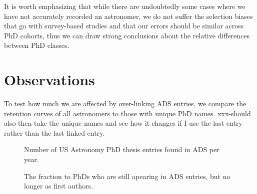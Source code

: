 \documentclass{emulateapj}
\begin{document}
It is worth emphasizing that while there are undoubtedly some cases where we have not accurately recorded an astronomer, we do not suffer the selection biases that go with survey-based studies and that our errors should be similar across PhD cohorts, thus we can draw strong conclusions about the relative differences between PhD classes.

\section{Observations}

To test how much we are affected by over-linking ADS entries, we compare the retention curves of all astronomers to those with unique PhD names.  xxx-should also then take the unique names and see how it changes if I use the last entry rather than the last linked entry.


\begin{figure}
  \caption{Number of US Astronomy PhD thesis entries found in ADS per year. \label{fig:phdperyear}}
\end{figure}

\begin{figure*}
  \caption{Plot of how long PhD astronomers stay active in the ADS archive.  Error bars are set by comparing to a subset of astronomers with more unique names as outlined in \S\ref{sec:db_construct}.   \label{fig:active_curves}}
  \end{figure*}


\begin{figure*}
  \caption{Like Figure~\ref{fig:active_curves}, but now using the most recent connected paper where the author is the first author.  The dashed lines show the curves from Figure~\ref{fig:active_curves} for comparison. The downturn in the older curves (1999-2004) could be an artifact caused by astronomers who lead a paper only every few years, e.g., two years from now those curves could rise back up.  \label{fig:1stA_active}}
\end{figure*}

\begin{figure}
  \caption{The fraction to PhDs who are still apearing in ADS entries, but no longer as first authors. \label{fig:non_1st_frac}}
\end{figure}
\end{document}
